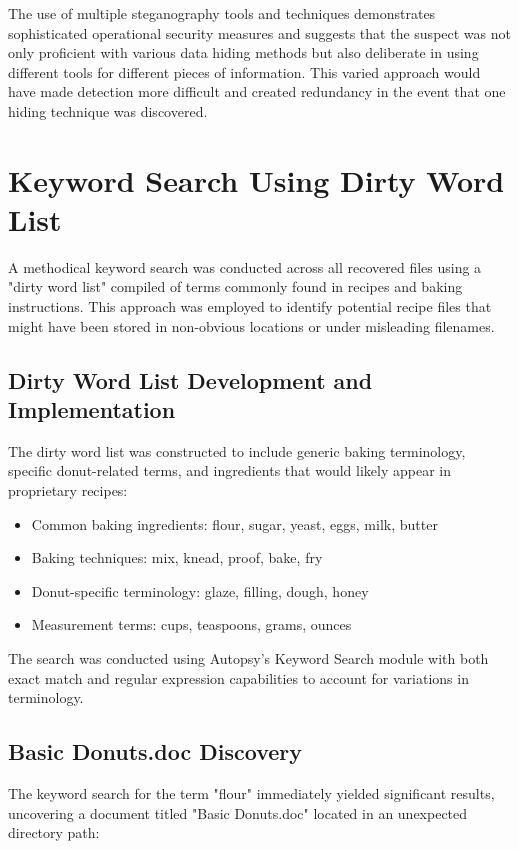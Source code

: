 The use of multiple steganography tools and techniques demonstrates sophisticated operational security measures and suggests that the suspect was not only proficient with various data hiding methods but also deliberate in using different tools for different pieces of information. This varied approach would have made detection more difficult and created redundancy in the event that one hiding technique was discovered.

\section{Keyword Search Using Dirty Word List}
A methodical keyword search was conducted across all recovered files using a "dirty word list" compiled of terms commonly found in recipes and baking instructions. This approach was employed to identify potential recipe files that might have been stored in non-obvious locations or under misleading filenames.

\subsection{Dirty Word List Development and Implementation}
The dirty word list was constructed to include generic baking terminology, specific donut-related terms, and ingredients that would likely appear in proprietary recipes:

\begin{itemize}
    \item Common baking ingredients: flour, sugar, yeast, eggs, milk, butter
    \item Baking techniques: mix, knead, proof, bake, fry
    \item Donut-specific terminology: glaze, filling, dough, honey
    \item Measurement terms: cups, teaspoons, grams, ounces
\end{itemize}

The search was conducted using Autopsy's Keyword Search module with both exact match and regular expression capabilities to account for variations in terminology.

\subsection{Basic Donuts.doc Discovery}
The keyword search for the term "flour" immediately yielded significant results, uncovering a document titled "Basic Donuts.doc" located in an unexpected directory path:

